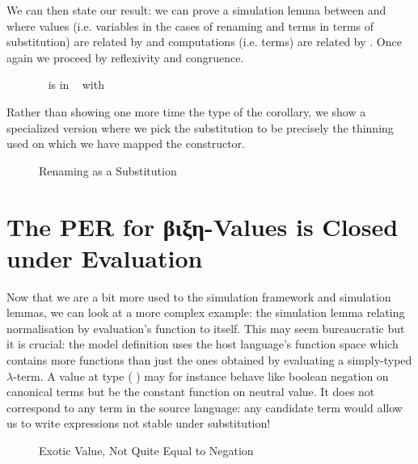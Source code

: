 
We can then state our result: we can prove a simulation lemma between 
and  where values (i.e. variables in the cases of renaming and terms
in terms of substitution) are related by  and computations (i.e. terms)
are related by . Once again we proceed by reflexivity and congruence.

\begin{figure}[h]
\caption{~ is in ~ with \label{fig:renissub}}
\end{figure}

Rather than showing one more time the type of the corollary, we show a specialized
version where we pick the substitution to be precisely the thinning used on which we
have mapped the  constructor.

\begin{figure}[h]
\caption{Renaming as a Substitution\label{fig:renassub}}
\end{figure}

\section{The PER for βιξη-Values is Closed under Evaluation}

Now that we are a bit more used to the simulation framework and simulation lemmas,
we can look at a more complex example: the simulation lemma relating normalisation
by evaluation's  function to itself. This may seem bureaucratic but it is
crucial: the model definition uses the host language's function space which contains
more functions than just the ones obtained by evaluating a simply-typed $λ$-term.
A value at type {(  )} may for instance behave like
boolean negation on canonical terms but be the constant  function on neutral
value. It does not correspond to any term in the source language: any candidate term
would allow us to write expressions not stable under substitution!

\begin{figure}[h]
\caption{Exotic Value, Not Quite Equal to Negation\label{fig:nbeexotic}}
\end{figure}

